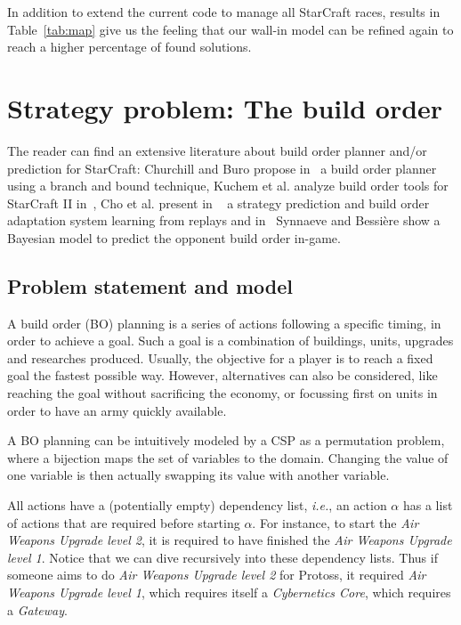 \documentclass[journal]{IEEEtran}
\newcommand{\csp}{\textsc{CSP}\xspace}
\newcommand{\ie}{\textit{i.e.}}
\begin{document}
In addition to extend the current  code to manage all StarCraft races,
results in  Table~\ref{tab:map} give us  the feeling that  our wall-in
model  can be  refined again  to reach  a higher  percentage of  found
solutions.


\section{Strategy problem: The build order}\label{sec:bo}

The reader can find an  extensive literature about build order planner
and/or   prediction  for   StarCraft:  Churchill   and  Buro   propose
in~\cite{ChurchillB11} a build order planner  using a branch and bound
technique, Kuchem  et al. analyze  build order tools for  StarCraft II
in~\cite{KuchemPR13},  Cho  et  al.    present  in  ~\cite{ChoKC13}  a
strategy prediction  and build  order adaptation system  learning from
replays and  in~\cite{SynnaeveB11-a} Synnaeve and Bessi{\`e}re  show a
Bayesian model to predict the opponent build order in-game.

\subsection{Problem statement and model}
A build order (BO) planning is a series of actions following a specific
timing, in order to  achieve a goal.  Such a goal  is a combination of
buildings,  units, upgrades  and  researches  produced.  Usually,  the
objective for a  player is to reach a fixed  goal the fastest possible
way. However, alternatives  can also be considered,  like reaching the
goal without sacrificing  the economy, or focussing first  on units in
order to have an army quickly available.

A  BO  planning can  be intuitively  modeled by  a \csp  as a
permutation problem,  where a bijection  maps the set of  variables to
the  domain. Changing  the  value  of one  variable  is then  actually
swapping its value with another variable.

All actions have a (potentially empty) dependency list, \ie, an action
$\alpha$  has a  list of  actions  that are  required before  starting
$\alpha$.   For instance,  to  start the  \textit{Air Weapons  Upgrade
  level 2},  it is required  to have finished the  \textit{Air Weapons
  Upgrade level  1}. Notice  that we can  dive recursively  into these
dependency  lists.  Thus  if someone  aims to  do \textit{Air  Weapons
  Upgrade  level  2}  for  Protoss, it  required  \textit{Air  Weapons
  Upgrade level 1}, which requires itself a \textit{Cybernetics Core},
which requires a \textit{Gateway}.
\end{document}
